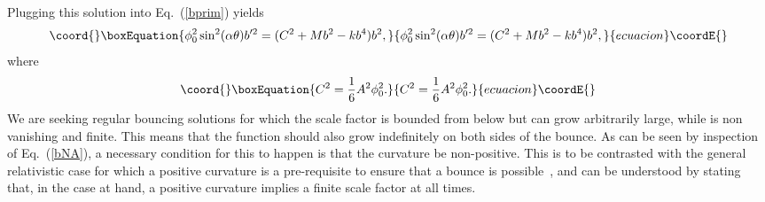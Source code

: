 \documentclass[a4paper,aps,twocolumn,prd,showpacs,nofootinbib]{revtex4}
\begin{document}
Plugging this solution into Eq.~(\ref{bprim}) yields
\begin{equation}\coord{}\boxEquation{
\phi_0^2 \sin^2(\alpha\theta) b'^2 = (C^2 + M b^2 - k b^4 ) b^2,
\label{bNA}
}{
\phi_0^2 \sin^2(\alpha\theta) b'^2 = (C^2 + M b^2 - k b^4 ) b^2,
}{ecuacion}\coordE{}\end{equation}
where 
\begin{equation}\coord{}\boxEquation{ 
C^2 = \frac{1}{6}A^2\phi_0^2.\label{C}
}{ 
C^2 = \frac{1}{6}A^2\phi_0^2.}{ecuacion}\coordE{}\end{equation}
We are seeking regular bouncing solutions for which the scale factor
is bounded from below but can grow arbitrarily large, while \myHighlight{$\phi$}\coordHE{} is
non vanishing and finite. This means that the function \coordHE{} should also
grow indefinitely on both sides of the bounce. As can be seen by
inspection of Eq.~(\ref{bNA}), a necessary condition for this to
happen is that the curvature be non-positive. This is to be contrasted
with the general relativistic case for which a positive curvature is a
pre-requisite to ensure that a bounce is possible~\cite{ppnpn1}, and
can be understood by stating that, in the case at hand, a positive
curvature implies a finite scale factor at all times.
\end{document}
